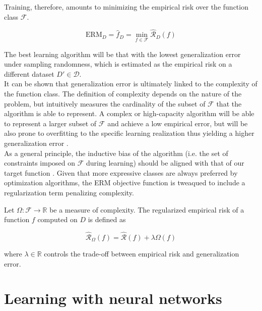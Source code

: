 Training, therefore, amounts to minimizing the empirical risk over the function class $\mathcal{F}$.

$$
\text{ERM}_D = \hat{f}_D = \min_{f \in \mathcal{F}} \hat{\mathcal{R}}_D(f)
$$

The best learning algorithm will be that with the lowest generalization error
under sampling randomness, which is estimated as the empirical risk 
on a different dataset $D' \in \mathcal{D}$. \\

It can be shown that generalization 
error is ultimately linked to the complexity of the function class. 
The definition of complexity depends 
on the nature of the problem, but intuitively measures the cardinality of the
subset of $\mathcal{F}$ that the algorithm is able to represent. A complex or 
high-capacity algorithm will be able to represent a larger subset 
of $\mathcal{F}$ and achieve a low empirical error, but will be also
prone to overfitting to the specific learning realization thus yielding 
a higher generalization error \cite{n.vapnikNatureStatisticalLearning2000}. \\

As a general principle, the inductive bias of the algorithm (i.e. the set of constraints imposed on $\mathcal{F}$ during learning) should be aligned with
that of our target function
\cite{jimenezInductiveBiasDeep}. 
Given that more expressive classes are always preferred by optimization algorithms, the ERM
objective function is tweaqued to include a regularization term penalizing complexity.

\begin{definition}\label{def:rrm}
    Let $\Omega: \mathcal{F} \to \mathbb{R}$ be a measure of complexity. The regularized empirical risk of a function $f$
    computed on $D$ is defined as

    $$
    \hat{\mathcal{R}}_{\Omega}(f)=\hat{\mathcal{R}}(f) + \lambda \Omega(f)
    $$

    where $\lambda \in \mathbb{R}$ controls the trade-off between empirical risk and generalization error.

\end{definition}



\section{Learning with neural networks}

